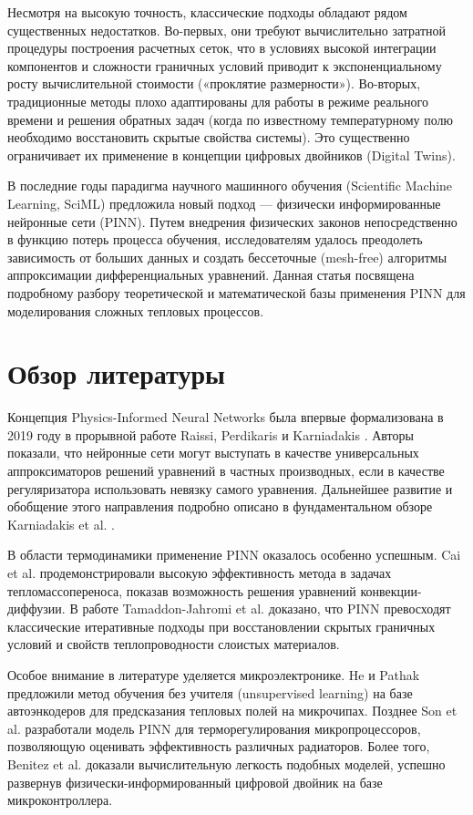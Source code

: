 \documentclass[conference]{IEEEtran}
\begin{document}
    Несмотря на высокую точность, классические подходы обладают рядом существенных недостатков. Во-первых, они требуют вычислительно затратной процедуры построения расчетных сеток, что в условиях высокой интеграции компонентов и сложности граничных условий приводит к экспоненциальному росту вычислительной стоимости («проклятие размерности»). Во-вторых, традиционные методы плохо адаптированы для работы в режиме реального времени и решения обратных задач (когда по известному температурному полю необходимо восстановить скрытые свойства системы). Это существенно ограничивает их применение в концепции цифровых двойников (Digital Twins).
    
    В последние годы парадигма научного машинного обучения (Scientific Machine Learning, SciML) предложила новый подход — физически информированные нейронные сети (PINN). Путем внедрения физических законов непосредственно в функцию потерь процесса обучения, исследователям удалось преодолеть зависимость от больших данных и создать бессеточные (mesh-free) алгоритмы аппроксимации дифференциальных уравнений. Данная статья посвящена подробному разбору теоретической и математической базы применения PINN для моделирования сложных тепловых процессов.
    
    \section{Обзор литературы}
    
    Концепция Physics-Informed Neural Networks была впервые формализована в 2019 году в прорывной работе Raissi, Perdikaris и Karniadakis \cite{raissi2019}. Авторы показали, что нейронные сети могут выступать в качестве универсальных аппроксиматоров решений уравнений в частных производных, если в качестве регуляризатора использовать невязку самого уравнения. Дальнейшее развитие и обобщение этого направления подробно описано в фундаментальном обзоре Karniadakis et al. \cite{karniadakis2021}.
    
    В области термодинамики применение PINN оказалось особенно успешным. Cai et al. \cite{cai2021} продемонстрировали высокую эффективность метода в задачах тепломассопереноса, показав возможность решения уравнений конвекции-диффузии. В работе Tamaddon-Jahromi et al. \cite{tamaddon2020} доказано, что PINN превосходят классические итеративные подходы при восстановлении скрытых граничных условий и свойств теплопроводности слоистых материалов. 
    
    Особое внимание в литературе уделяется микроэлектронике. He и Pathak \cite{he2020} предложили метод обучения без учителя (unsupervised learning) на базе автоэнкодеров для предсказания тепловых полей на микрочипах. Позднее Son et al. \cite{son2023} разработали модель PINN для терморегулирования микропроцессоров, позволяющую оценивать эффективность различных радиаторов. Более того, Benitez et al. \cite{benitez2024} доказали вычислительную легкость подобных моделей, успешно развернув физически-информированный цифровой двойник на базе микроконтроллера.
    
\end{document}

